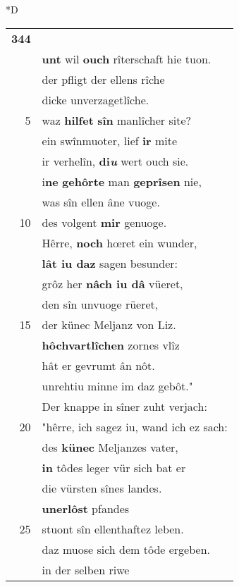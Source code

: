 \documentclass[8pt,a4paper,notitlepage]{article}
\begin{document}
\begin{table}[ht]
\begin{minipage}[t]{0.5\linewidth}
\small
\begin{center}*D
\end{center}
\begin{tabular}{rl}
\textbf{344} & \textbf{\begin{large}E\end{large}r} ist Poydiconjunzes sun\\ 
 & \textbf{unt} wil \textbf{ouch} rîterschaft hie tuon.\\ 
 & der pfligt der ellens rîche\\ 
 & dicke unverzagetlîche.\\ 
5 & waz \textbf{hilfet} \textbf{sîn} manlîcher site?\\ 
 & ein swînmuoter, lief \textbf{ir} mite\\ 
 & ir verhelîn, \textbf{di\textit{u}} wert ouch sie.\\ 
 & i\textbf{ne} \textbf{gehôrte} man \textbf{geprîsen} nie,\\ 
 & was sîn ellen âne vuoge.\\ 
10 & des volgent \textbf{mir} genuoge.\\ 
 & Hêrre, \textbf{noch} hœret ein wunder,\\ 
 & \textbf{lât iu daz} sagen besunder:\\ 
 & grôz her \textbf{nâch iu dâ} vüeret,\\ 
 & den sîn unvuoge rüeret,\\ 
15 & der künec Meljanz von Liz.\\ 
 & \textbf{hôchvartlîchen} zornes vlîz\\ 
 & hât er gevrumt ân nôt.\\ 
 & unrehtiu minne im daz gebôt."\\ 
 & Der knappe in sîner zuht verjach:\\ 
20 & "hêrre, ich sagez iu, wand ich ez sach:\\ 
 & des \textbf{künec} Meljanzes vater,\\ 
 & \textbf{in} tôdes leger vür sich bat er\\ 
 & die vürsten sînes landes.\\ 
 & \textbf{unerlôst} pfandes\\ 
25 & stuont sîn ellenthaftez leben.\\ 
 & daz muose sich dem tôde ergeben.\\ 
 & in der selben riwe\\ 

\end{tabular}
\end{minipage}
\end{table}
\end{document}
